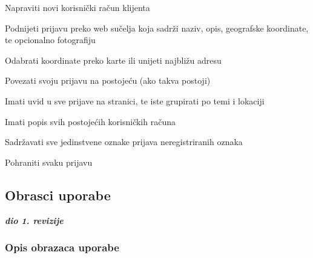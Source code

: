\begin{packed_enum}
				\item  {}
				
				\begin{packed_enum}
					\item Napraviti novi korisnički račun klijenta
					\item Podnijeti prijavu preko web sučelja koja sadrži naziv, opis, geografske koordinate, te opcionalno fotografiju
					\item Odabrati koordinate preko karte ili unijeti najbližu adresu
					\item Povezati svoju prijavu na postojeću (ako takva postoji)
					\item Imati uvid u sve prijave na stranici, te iste grupirati po temi i lokaciji

				\end{packed_enum}
				
				\item  {}
				
				\begin{packed_enum}
				\item Imati popis svih postojećih korisničkih računa
				\item Sadržavati sve jedinstvene oznake prijava neregistriranih oznaka
				\item Pohraniti svaku prijavu
					
				\end{packed_enum}
			\end{packed_enum}
			\eject 
			
			
				
			\subsection{Obrasci uporabe}
				
				\textbf{\textit{dio 1. revizije}}
				
				\subsubsection{Opis obrazaca uporabe}
					

